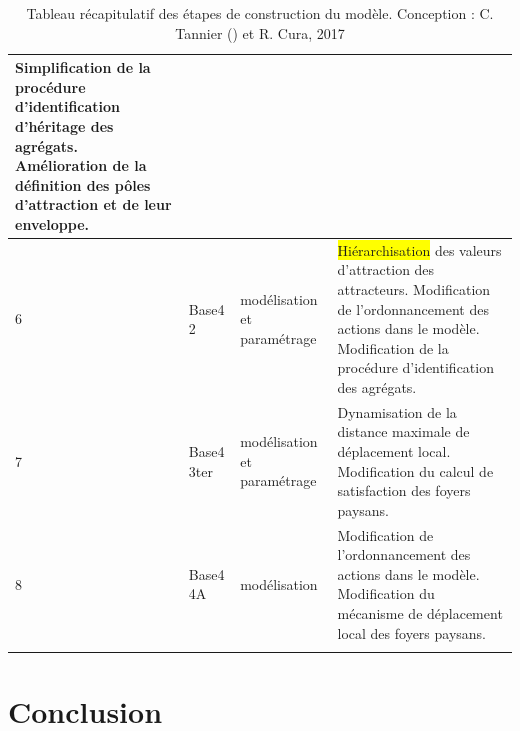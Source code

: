 \begin{footnotesize}
\begin{longtable}{ m{} m{} m{} m{}}
		Simplification de la procédure d'identification d'héritage des agrégats.
		Amélioration de la définition des pôles d'attraction et de leur enveloppe. \\
		\hline
		6 & Base4 2 & modélisation et paramétrage & \colorbox{yellow}{Hiérarchisation} des valeurs d'attraction des attracteurs. \newline
		Modification de l'ordonnancement des actions dans le modèle.\newline
		Modification de la procédure d'identification des agrégats. \\
		\hline
		7 & Base4 3ter & modélisation et paramétrage &
		Dynamisation de la distance maximale de déplacement local.
		\newline
		Modification du calcul de satisfaction des foyers paysans. \\
		\hline
		8 & Base4 4A & modélisation & Modification de l'ordonnancement des actions dans le modèle. \newline
		Modification du mécanisme de déplacement local des foyers paysans. \\
		\hline
		\caption{Tableau récapitulatif des étapes de construction du modèle. Conception : C. Tannier (\fixref{Tannier 2017, HDR}) et R. Cura, 2017}
		\label{table:etapes-construction}
	\end{longtable}
\end{footnotesize}

\section*{Conclusion}
\label{sec:chap3-conclu}

